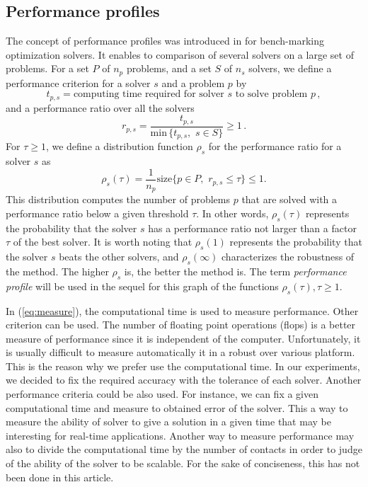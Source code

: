 \subsection{Performance profiles}

The concept of performance profiles was introduced in \citep{Dolan.More_MP2002} for bench-marking optimization solvers. It enables to comparison of several solvers on a large set of problems. For a set $P$ of $n_p$ problems, and a set $S$ of $n_s$ solvers, we define a performance criterion for a solver $s$ and a problem $p$ by
\begin{equation}
  \label{eq:measure}
 t_{p,s} = \text{computing time required for solver}\, \,  s\, \,  \text{to solve problem}\, \,  p \, ,
\end{equation}
and a performance ratio over all the solvers
\begin{equation}
 r_{p, s} = \frac{t_{p,s}}{\text{min}\, \{t_{p,s}, \, \, s \in S\}} \geq 1 \, .
\end{equation}
For $\tau \geq 1$, we define a  distribution function $\rho_s$ for the performance ratio for a solver $s$ as
\begin{equation}
 \rho_s(\tau) = \frac{1}{n_p} \text{size} \{p \in P, \, \, r_{p, s} \leq \tau\} \leq 1.
\end{equation}
This distribution computes the number of problems $p$ that are solved with a performance ratio below a given threshold $\tau$. In other words, $\rho_s(\tau)$ represents the probability that the solver $s$ has a performance ratio not larger than a factor $\tau$ of the best solver. It is worth noting that $\rho_s(1)$ represents the probability that the solver $s$ beats the other solvers, and $\rho_s(\infty)$ characterizes the robustness of the method.
The higher $\rho_s$ is, the better the method is. The term \textit{performance profile} will be used in the sequel for this graph of the functions $\rho_s(\tau), \tau \geq 1$.

In (\ref{eq:measure}), the computational time is used to measure performance. Other criterion can be used. The number of floating point operations (flops) is a better measure of performance since it is independent of the computer. Unfortunately, it is usually difficult to measure automatically it in a robust over various platform. This is the reason why we prefer use the computational time. In our experiments, we decided to fix the required accuracy with the tolerance of each solver. Another performance criteria could be also used. For instance, we can fix a given computational time and measure to obtained error of the solver. This a way to measure the ability of solver to give a solution in a given time that may be interesting for real-time applications. Another way to measure performance may also to divide the computational time by the number of contacts in order to judge of the ability of the solver to be scalable. For the sake of conciseness, this has not been done in this article.

